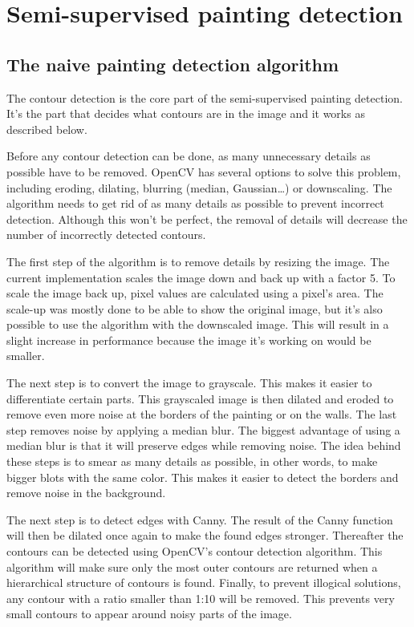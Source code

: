 \section{Semi-supervised painting detection}
\label{sec:assignment1}

\subsection{The naive painting detection algorithm}
\label{subsec:contour_detection}

The contour detection is the core part of the semi-supervised painting detection. It's the part that decides what contours are in the image and it works as described below.

Before any contour detection can be done, as many unnecessary details as possible have to be removed. OpenCV has several options to solve this problem, including eroding, dilating, blurring (median, Gaussian\dots) or downscaling. The algorithm needs to get rid of as many details as possible to prevent incorrect detection. Although this won't be perfect, the removal of details will decrease the number of incorrectly detected contours.

The first step of the algorithm is to remove details by resizing the image. The current implementation scales the image down and back up with a factor 5. To scale the image back up, pixel values are calculated using a pixel's area. The scale-up was mostly done to be able to show the original image, but it's also possible to use the algorithm with the downscaled image. This will result in a slight increase in performance because the image it's working on would be smaller.

The next step is to convert the image to grayscale. This makes it easier to differentiate certain parts. This grayscaled image is then dilated and eroded to remove even more noise at the borders of the painting or on the walls. The last step removes noise by applying a median blur. The biggest advantage of using a median blur is that it will preserve edges while removing noise. The idea behind these steps is to smear as many details as possible, in other words, to make bigger blots with the same color. This makes it easier to detect the borders and remove noise in the background.

The next step is to detect edges with Canny. The result of the Canny function will then be dilated once again to make the found edges stronger. Thereafter the contours can be detected using OpenCV's contour detection algorithm. This algorithm will make sure only the most outer contours are returned when a hierarchical structure of contours is found. Finally, to prevent illogical solutions, any contour with a ratio smaller than 1:10 will be removed. This prevents very small contours to appear around noisy parts of the image.


